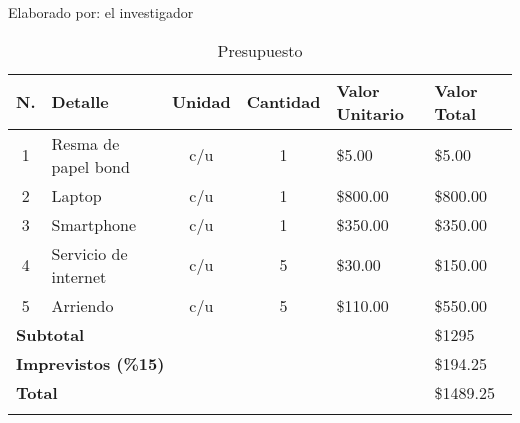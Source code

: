 \begin{ThreePartTable}
	\begin{TableNotes}[flushleft]
		\centering
		\item Elaborado por: el investigador
	\end{TableNotes}
  \begin{longtable}{c p{} c c p{} p{}}
		\caption{Presupuesto}
		\label{table:presupuesto}                                                                                                                                     \\
		\toprule
		\textbf{N.}                                     & \textbf{Detalle}     & \textbf{Unidad} & \textbf{Cantidad} & \textbf{Valor Unitario} & \textbf{Valor Total} \\
		\midrule
		1                                               & Resma de papel bond  & c/u             & 1                 & \$5.00                  & \$5.00               \\
		2                                               & Laptop               & c/u             & 1                 & \$800.00                & \$800.00             \\
		3                                               & Smartphone           & c/u             & 1                 & \$350.00                & \$350.00             \\
		4                                               & Servicio de internet & c/u             & 5                 & \$30.00                 & \$150.00             \\
		5                                               & Arriendo             & c/u             & 5                 & \$110.00                & \$550.00             \\
		\midrule
		\multicolumn{5}{l}{\textbf{Subtotal}}           & \$1295                                                                                                      \\
		\multicolumn{5}{l}{\textbf{Imprevistos (\%15)}} & \$194.25                                                                                                    \\
		\multicolumn{5}{l}{\textbf{Total}}              & \$1489.25                                                                                                   \\
		\bottomrule
		\insertTableNotes
	\end{longtable}
\end{ThreePartTable}
